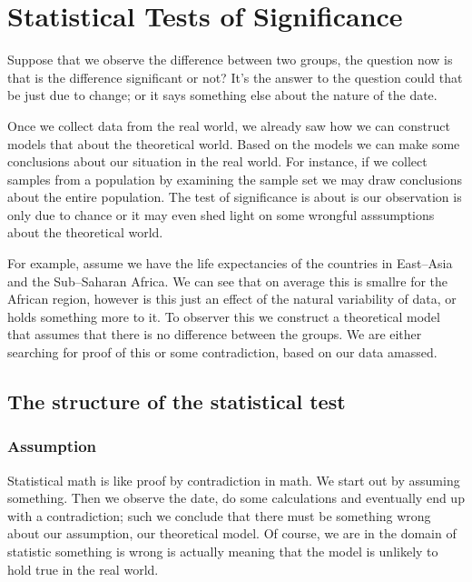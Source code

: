 \chapter*{Statistical Tests of Significance}

\setcounter{section}{0}
\renewcommand*{\theHsection}{ch5.\the\value{section}}

Suppose that we observe the difference between two groups, the question now is
that is the difference significant or not? It's the answer to the question could
that be just due to change; or it says something else about the nature of the
date.

Once we collect data from the real world, we already saw how we can construct
models that about the theoretical world. Based on the models we can make some
conclusions about our situation in the real world. For instance, if we collect
samples from a population by examining the sample set we may draw conclusions
about the entire population. The test of significance is about is our
observation is only due to chance or it may even shed light on some wrongful
asssumptions about the theoretical world.

For example, assume we have the life expectancies of the countries in East--Asia
and the Sub--Saharan Africa. We can see that on average this is smallre for the
African region, however is this just an effect of the natural variability of
data, or holds something more to it. To observer this we construct a theoretical
model that assumes that there is no difference between the groups. We are either
searching for proof of this or some contradiction, based on our data amassed.

\section{The structure of the statistical test}

\subsection{Assumption}

Statistical math is like proof by contradiction in math. We start out by
assuming something. Then we observe the date, do some calculations and
eventually end up with a contradiction; such we conclude that there must be
something wrong about our assumption, our theoretical model. Of course, we are
in the domain of statistic something is wrong is actually meaning that the model
is unlikely to hold true in the real world.

